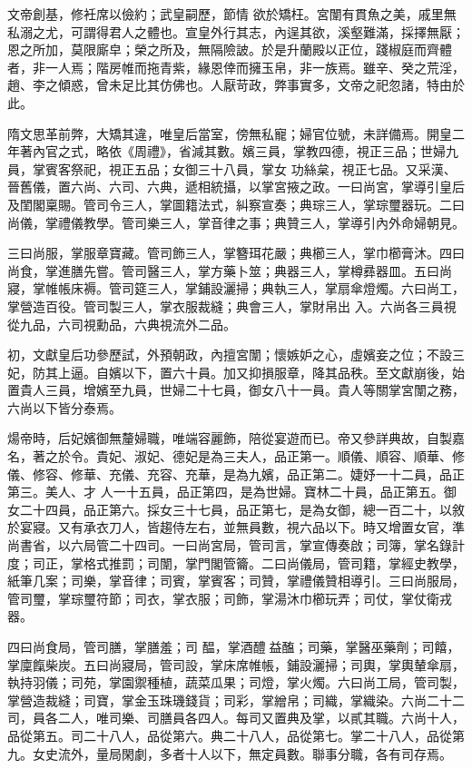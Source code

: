 \begin{pinyinscope}
 文帝創基，修衽席以儉約；武皇嗣歷，節情
 欲於矯枉。宮闈有貫魚之美，戚里無私溺之尤，可謂得君人之體也。宣皇外行其志，內逞其欲，溪壑難滿，採擇無厭；恩之所加，莫限廝皁；榮之所及，無隔險詖。於是升蘭殿以正位，踐椒庭而齊體者，非一人焉；階房帷而拖青紫，緣恩倖而擁玉帛，非一族焉。雖辛、癸之荒淫，趙、李之傾惑，曾未足比其仿佛也。人厭苛政，弊事實多，文帝之祀忽諸，特由於此。



 隋文思革前弊，大矯其違，唯皇后當室，傍無私寵；婦官位號，未詳備焉。開皇二年著內官之式，略依《周禮》，省減其數。嬪三員，掌教四德，視正三品；世婦九員，掌賓客祭祀，視正五品；女御三十八員，掌女
 功絲枲，視正七品。又采漢、晉舊儀，置六尚、六司、六典，遞相統攝，以掌宮掖之政。一曰尚宮，掌導引皇后及閨閣稟賜。管司令三人，掌圖籍法式，糾察宣奏；典琮三人，掌琮璽器玩。二曰尚儀，掌禮儀教學。管司樂三人，掌音律之事；典贊三人，掌導引內外命婦朝見。



 三曰尚服，掌服章寶藏。管司飾三人，掌簪珥花嚴；典櫛三人，掌巾櫛膏沐。四曰尚食，掌進膳先嘗。管司醫三人，掌方藥卜筮；典器三人，掌樽彞器皿。五曰尚寢，掌帷帳床褥。管司筵三人，掌鋪設灑掃；典執三人，掌扇傘燈燭。六曰尚工，掌營造百役。管司製三人，掌衣服裁縫；典會三人，掌財帛出
 入。六尚各三員視從九品，六司視勳品，六典視流外二品。



 初，文獻皇后功參歷試，外預朝政，內擅宮闈；懷嫉妒之心，虛嬪妾之位；不設三妃，防其上逼。自嬪以下，置六十員。加又抑損服章，降其品秩。至文獻崩後，始置貴人三員，增嬪至九員，世婦二十七員，御女八十一員。貴人等關掌宮闈之務，六尚以下皆分泰焉。



 煬帝時，后妃嬪御無釐婦職，唯端容麗飾，陪從宴遊而已。帝又參詳典故，自製嘉名，著之於令。貴妃、淑妃、德妃是為三夫人，品正第一。順儀、順容、順華、修儀、修容、修華、充儀、充容、充華，是為九嬪，品正第二。婕妤一十二員，品正第三。美人、才
 人一十五員，品正第四，是為世婦。寶林二十員，品正第五。御女二十四員，品正第六。採女三十七員，品正第七，是為女御，總一百二十，以敘於宴寢。又有承衣刀人，皆趨侍左右，並無員數，視六品以下。時又增置女官，準尚書省，以六局管二十四司。一曰尚宮局，管司言，掌宣傳奏啟；司簿，掌名錄計度；司正，掌格式推罰；司闈，掌門閣管籥。二曰尚儀局，管司籍，掌經史教學，紙筆几案；司樂，掌音律；司賓，掌賓客；司贊，掌禮儀贊相導引。三曰尚服局，管司璽，掌琮璽符節；司衣，掌衣服；司飾，掌湯沐巾櫛玩弄；司仗，掌仗衛戎器。



 四曰尚食局，管司膳，掌膳羞；司
 醖，掌酒醴益醢；司藥，掌醫巫藥劑；司饎，掌廩餼柴炭。五曰尚寢局，管司設，掌床席帷帳，鋪設灑掃；司輿，掌輿輦傘扇，執持羽儀；司苑，掌園禦種植，蔬菜瓜果；司燈，掌火燭。六曰尚工局，管司製，掌營造裁縫；司寶，掌金玉珠璣錢貨；司彩，掌繒帛；司織，掌織染。六尚二十二司，員各二人，唯司樂、司膳員各四人。每司又置典及掌，以貳其職。六尚十人，品從第五。司二十八人，品從第六。典二十八人，品從第七。掌二十八人，品從第九。女史流外，量局閑劇，多者十人以下，無定員數。聯事分職，各有司存焉。




\end{pinyinscope}
